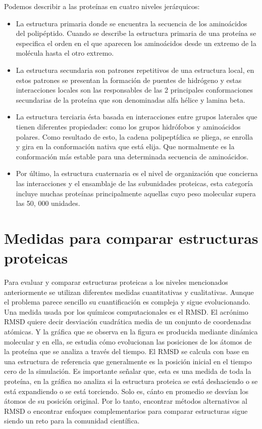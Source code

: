 Podemos describir a las prote\'{i}nas en cuatro niveles jer\'{a}rquicos:

\begin{itemize}

\item La estructura primaria donde se encuentra la secuencia de los
amino\'{a}cidos del polip\'{e}ptido. Cuando se describe la estructura primaria de una prote\'{i}na se especiﬁca el
orden en el que aparecen los amino\'{a}cidos desde un extremo de la mol\'{e}cula hasta el otro extremo.

\item La estructura secundaria son patrones repetitivos de una estructura local, en estos
patrones se presentan la formaci\'{o}n de puentes de hidr\'{o}geno y estas interacciones locales son las
responsables de las 2 principales conformaciones secundarias de la prote\'{i}na que son denominadas alfa
h\'{e}lice y lamina beta.


\item La estructura terciaria \'{e}sta basada en interacciones entre grupos laterales que tienen diferentes
propiedades: como los grupos hidr\'{o}fobos y amino\'{a}cidos polares. Como resultado de esto, la cadena
polipept\'{i}dica se pliega, se enrolla y gira en la conformaci\'{o}n nativa que est\'{a} elija. Que normalmente es la
conformaci\'{o}n m\'{a}s estable para una determinada secuencia de amino\'{a}cidos.


\item Por último, la estructura cuaternaria es el nivel de organizaci\'{o}n que concierna las
interacciones y el ensamblaje de las subunidades proteicas, esta categor\'{i}a incluye muchas prote\'{i}nas
principalmente aquellas cuyo peso molecular supera las 50, 000 unidades.

\end{itemize}

\section{Medidas para comparar estructuras proteicas}

Para evaluar y comparar estructuras proteicas a los niveles mencionados anteriormente se utilizan
diferentes medidas cuantitativas y cualitativas. Aunque el problema parece sencillo su cuantiﬁcaci\'{o}n es
compleja y sigue evolucionando. Una medida usada por los qu\'{i}micos computacionales es el RMSD. El acrónimo RMSD quiere decir desviación
cuadrática media de un conjunto de coordenadas atómicas. Y la gr\'{a}ﬁca que se observa en la figura 
es producida mediante dinámica molecular y en ella, se estudia cómo evolucionan las posiciones de los
átomos de la proteína que se analiza a través del tiempo. El RMSD se calcula con base en una estructura
de referencia que generalmente es la posición inicial en el tiempo cero de la simulación.
Es importante señalar que, esta es una medida de toda la proteína, en la gr\'{a}ﬁca no analiza si la estructura
proteica se está deshaciendo o se est\'{a} expandiendo o se está torciendo. Solo es, c\'{a}nto en promedio se desvían los \'{a}tomos de su posición original. Por lo tanto, encontrar
m\'{e}todos alternativos al RMSD o encontrar enfoques complementarios para comparar estructuras
sigue siendo un reto para la comunidad cient\'{i}ﬁca.
